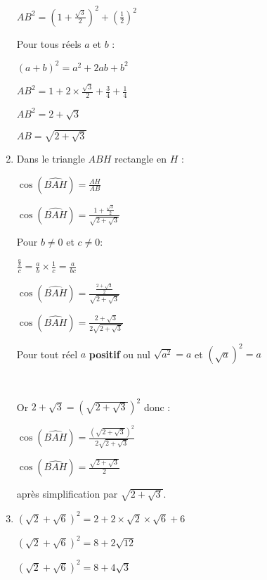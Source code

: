 \begin{corrige}
\begin{enumerate}
          \par
          $AB^2=\left(1+ \frac{ \sqrt{3} }{2} \right)^2+\left( \frac{1}{2} \right)^2$
          \begin{note}Pour tous réels $a$ et $b$ :
               \par
               $(a+b)^2$$=a^2+2ab+b^2$
          \end{note}
          $AB^2=1 + 2 \times \frac{ \sqrt{3} }{2} +  \frac{3}{4} + \frac{1}{4} $
          \par
          $AB^2=2+  \sqrt{3}$
          \par
          $AB=\sqrt{2+  \sqrt{3}}$
          \item
          Dans le triangle $ABH$ rectangle en $H$ :
          \par
          $\cos(\widehat{BAH})= \frac{AH}{AB} $
          \par
          $\cos(\widehat{BAH})= \frac{1+\frac{\sqrt{3}}{2}}{\sqrt{2+  \sqrt{3}} } $
          \begin{note}Pour $b \neq 0$ et $c \neq 0$:
               \par
               $\frac{\frac{a}{b}}{c}=\frac{a}{b}\times \frac{1}{c}=\frac{a}{bc}$
          \end{note}
          $\cos(\widehat{BAH})= \frac{\frac{2+\sqrt{3}}{2}}{\sqrt{2+  \sqrt{3}} } $
          \par
          $\cos(\widehat{BAH})= \frac{2+\sqrt{3}} {2\sqrt{2+  \sqrt{3}} } $
          \begin{note}Pour tout réel $a$ \textbf{positif} ou nul $\sqrt{a^2}=a$ et  $(\sqrt{a})^2=a$
          \end{note}
          ~
          \par
          Or $2+  \sqrt{3} =\left(\sqrt{2+  \sqrt{3}} \right)^2$ donc :
          \par
          $\cos(\widehat{BAH})= \frac{\left(\sqrt{2+  \sqrt{3}} \right)^2} {2\sqrt{2+  \sqrt{3}} } $
          \par
          $\cos(\widehat{BAH})= \frac{\sqrt{2+  \sqrt{3} }} {2} $
          \par
          après simplification par $\sqrt{2+  \sqrt{3}}$.
          \item
          $( \sqrt{2} +  \sqrt{6})^2 =2+2\times \sqrt{2} \times \sqrt{6} + 6$
          \par
          $( \sqrt{2} +  \sqrt{6})^2 =8+2 \sqrt{12} $
          \par
          $( \sqrt{2} +  \sqrt{6})^2 =8+4 \sqrt{3} $
          \par

\end{enumerate}
\end{corrige}
